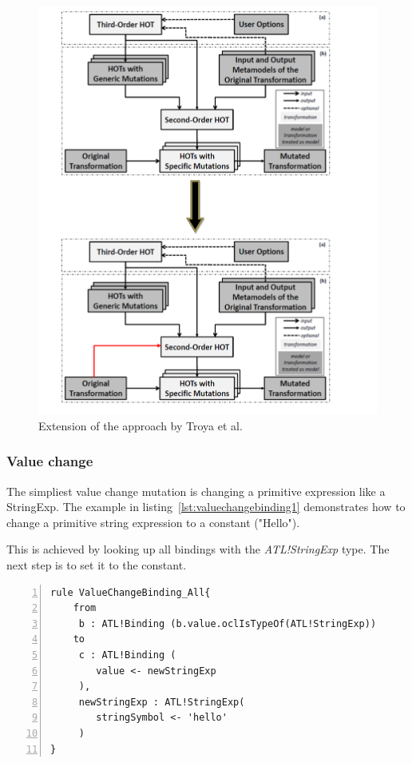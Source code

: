 \documentclass{llncs}
\begin{document}
\begin{figure}
	\centering
	\includegraphics[angle=0,width=1\textwidth,natwidth=610,natheight=642]{figures/grafik_neu2.png}
	\caption{Extension of the approach by Troya et al. \cite{Bergmayr:2014}}
	\label{fig:addBindingReference}
\end{figure}


\subsubsection{Value change}

The simpliest value change mutation is changing a primitive expression like a StringExp. The example in listing~\ref{lst:valuechangebinding1} demonstrates how to change a primitive string expression to a constant ("Hello").

This is achieved by looking up all bindings with the \emph{ATL!StringExp} type. The next step is to set it to the constant.

\begin{lstlisting}[language=ATL, numbers=left,xleftmargin=5.0ex, caption=ValueChangeBinding-Definition., label=lst:valuechangebinding1]
rule ValueChangeBinding_All{
	from
	 b : ATL!Binding (b.value.oclIsTypeOf(ATL!StringExp))
	to
	 c : ATL!Binding (
	 	value <- newStringExp
	 ),
	 newStringExp : ATL!StringExp(
	 	stringSymbol <- 'hello'	
	 )
}
\end{lstlisting}
\end{document}
